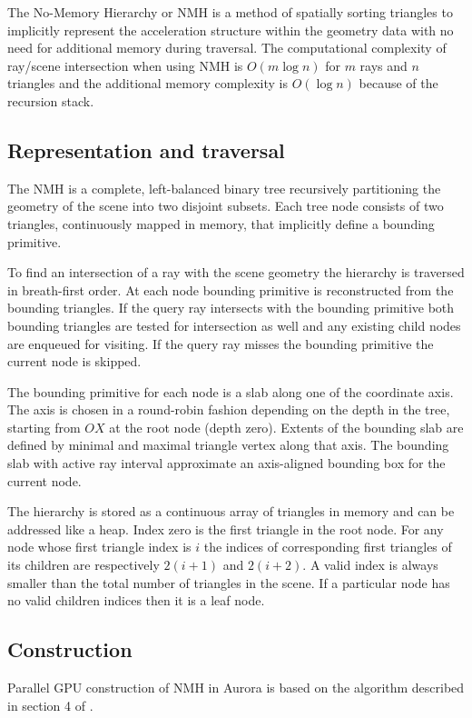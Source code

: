 The No-Memory Hierarchy or NMH \parencite{eisemann2012} is a method of spatially sorting triangles to implicitly represent the acceleration structure within the geometry data with no need for additional memory during traversal. The computational complexity of ray/scene intersection when using NMH is $O(m \log n)$ for $m$ rays and $n$ triangles and the additional memory complexity is $O(\log n)$ because of the recursion stack.

\subsection{Representation and traversal}
The NMH is a complete, left-balanced binary tree recursively partitioning the geometry of the scene into two disjoint subsets. Each tree node consists of two triangles, continuously mapped in memory, that implicitly define a bounding primitive.

To find an intersection of a ray with the scene geometry the hierarchy is traversed in breath-first order. At each node bounding primitive is reconstructed from the bounding triangles. If the query ray intersects with the bounding primitive both bounding triangles are tested for intersection as well and any existing child nodes are enqueued for visiting. If the query ray misses the bounding primitive the current node is skipped.

The bounding primitive for each node is a slab along one of the coordinate axis. The axis is chosen in a round-robin fashion depending on the depth in the tree, starting from $OX$ at the root node (depth zero). Extents of the bounding slab are defined by minimal and maximal triangle vertex along that axis. The bounding slab with active ray interval approximate an axis-aligned bounding box for the current node.

The hierarchy is stored as a continuous array of triangles in memory and can be addressed like a heap. Index zero is the first triangle in the root node. For any node whose first triangle index is $i$ the indices of corresponding first triangles of its children are respectively $2(i+1)$ and $2(i+2)$. A valid index is always smaller than the total number of triangles in the scene. If a particular node has no valid children indices then it is a leaf node.

\subsection{Construction}
Parallel GPU construction of NMH in Aurora is based on the algorithm described in section 4 of \cite{eisemann2012}.

